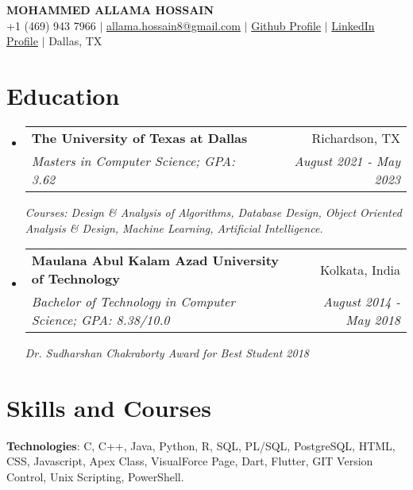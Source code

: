 \documentclass[letterpaper,11pt]{article}
\makeatletter
\newcommand{\resumeSubheading}[4]{
  \vspace{-1pt}\item
    \begin{tabular*}{0.97\textwidth}{l@{\extracolsep{\fill}}r}
      \textbf{#1} & #2 \\
      \textit{\small#3} & \textit{\small #4} \\
    \end{tabular*}\vspace{-5pt}
}
\newcommand{\resumeSubHeadingListStart}{\begin{itemize}[leftmargin=0.15in, label={}]}
\newcommand{\resumeSubHeadingListEnd}{\end{itemize}}
\makeatother
\begin{document}

\begin{center}
    \textbf{\Huge \scshape MOHAMMED ALLAMA HOSSAIN} \\ \vspace{1pt}
    \small +1 (469) 943 7966 $|$ \href{mailto:allama.hossain8@gmail.com}{{allama.hossain8@gmail.com}} $|$ 
    \href{https://github.com/allama008}{{Github Profile}} $|$ 
    \href{https://www.linkedin.com/in/allama008/}{{LinkedIn Profile}} $|$ 
    \small Dallas, TX
\end{center}


\section{Education}
  \resumeSubHeadingListStart
    \resumeSubheading
    {The University of Texas at Dallas}{Richardson, TX}
    {Masters in Computer Science;  GPA: 3.62}{August 2021 - May 2023}

    {\scriptsize \textit{Courses: Design \& Analysis of Algorithms, Database Design, Object Oriented Analysis \& Design, Machine Learning, Artificial Intelligence.}}

    \resumeSubheading
      {Maulana Abul Kalam Azad University of Technology}{Kolkata, India}
      {Bachelor of Technology in Computer Science;  GPA: 8.38/10.0}{August 2014 - May 2018}
    
      {\scriptsize \textit{Dr. Sudharshan Chakraborty Award for Best Student 2018}}

  \resumeSubHeadingListEnd


\section{Skills and Courses}
 \begin{itemize}[leftmargin=0.15in, label={}]
    \small{\item{
     \textbf{Technologies}{: C, C++, Java, Python, R, SQL, PL/SQL, PostgreSQL, HTML, CSS, Javascript, Apex Class, VisualForce Page, Dart, Flutter, GIT Version Control, Unix Scripting, PowerShell.} \\
    }}
 \end{itemize}
\end{document}
